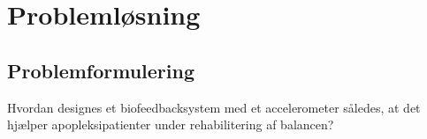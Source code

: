 





\frontmatter

\tableofcontents*
\mainmatter

%
\chapter{Problemløsning}

\section{Problemformulering}
Hvordan designes et biofeedbacksystem med et accelerometer således, at det hjælper apopleksipatienter under rehabilitering af balancen?





\backmatter
\begingroup
\raggedright


\endgroup

